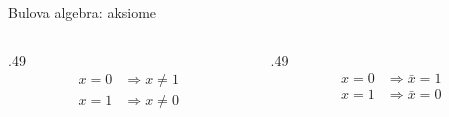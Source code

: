 \begin{frame}[label=01-s022]{Bulova algebra: aksiome}
\begin{columns}[T,onlytextwidth]
\begin{column}{.49\textwidth}
\vspace{1mm}
\[\begin{aligned}x=0&\Rightarrow x\ne1\\x=1&\Rightarrow x\ne0\end{aligned}\]
\end{column}
\begin{column}{.49\textwidth}
\vspace{1mm}
\[\begin{aligned}x=0&\Rightarrow\bar{x}=1\\x=1&\Rightarrow\bar{x}=0\end{aligned}\]
\end{column}
\end{columns}
\vspace{4mm}
\vspace{2mm}
\begin{center}\end{center}

\end{frame}

